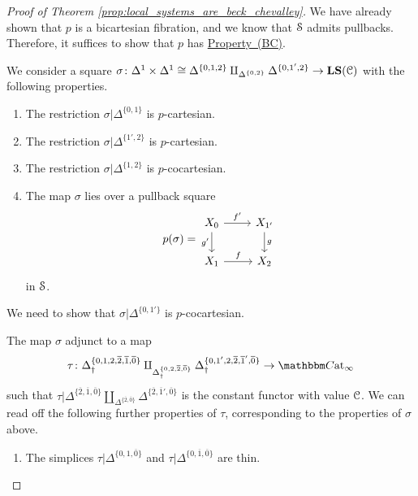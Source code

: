 \documentclass[main.tex]{subfiles}
\begin{document}
\begin{proof}[Proof of Theorem \ref{prop:local_systems_are_beck_chevalley}]
  We have already shown that $p$ is a bicartesian fibration, and we know that $\S$ admits pullbacks. Therefore, it suffices to show that $p$ has \hyperref[item:beck_chevalley_condition]{Property~(BC)}.

  We consider a square $\sigma\colon \Delta^{1} \times \Delta^{1} \cong \Delta^{\{0,1,2\}} \amalg_{\Delta^{\{0,2\}}}\Delta^{\{0,1',2\}} \to \LS(\category{C})$ with the following properties.
  \begin{enumerate}
    \item The restriction $\sigma|\Delta^{\{0,1\}}$ is $p$-cartesian.

    \item The restriction $\sigma|\Delta^{\{1',2\}}$ is $p$-cartesian.

    \item The restriction $\sigma|\Delta^{\{1,2\}}$ is $p$-cocartesian.

    \item The map $\sigma$ lies over a pullback square
      \begin{equation*}
        p(\sigma) =
        \begin{tikzcd}
          X_{0}
          \arrow[r, "f'"]
          \arrow[d, swap, "g'"]
          & X_{1'}
          \arrow[d, "g"]
          \\
          X_{1}
          \arrow[r, "f"]
          & X_{2}
        \end{tikzcd}
      \end{equation*}
      in $\S$.
  \end{enumerate}
  We need to show that $\sigma|\Delta^{\{0,1'\}}$ is $p$-cocartesian.

  The map $\sigma$ adjunct to a map
  \begin{equation*}
    \tau\colon \Delta^{\{0,1,2,\overline{2}, \overline{1}, \overline{0}\}}_{\dagger}\amalg_{\Delta^{\{0,2,\overline{2}, \overline{0}\}}_{\dagger}} \Delta^{\{0,1',2,\overline{2}, \overline{1}', \overline{0}\}}_{\dagger} \to \ICCat
  \end{equation*}
  such that $\tau|\Delta^{\{\overline{2}, \overline{1}, \overline{0}\}} \amalg_{\Delta^{\{\overline{2},\overline{0}\}}} \Delta^{\{\overline{2}, \overline{1}', \overline{0}\}}$ is the constant functor with value $\category{C}$. We can read off the following further properties of $\tau$, corresponding to the properties of $\sigma$ above.
  \begin{enumerate}
    \item The simplices $\tau|\Delta^{\{0,1,\overline{0}\}}$ and $\tau|\Delta^{\{0,\overline{1},\overline{0}\}}$ are thin.


\end{enumerate}
\end{proof}
\end{document}
